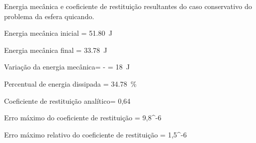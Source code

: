 \begin{table}[h]
\centering
\caption{Energia mecânica e coeficiente de restituição resultantes do caso conservativo do problema da esfera quicando.}
\label{tab:colliding_spheres:dissipative_rotation:energy_and_coefficient_of_restitution}
\begin{parametersdesc}{\textwidth}
	\item{Energia mecânica inicial}{\initial{\mechanicalEnergy} = \SI{51,80}{\joule}}{}
	\item{Energia mecânica final}{\final{\mechanicalEnergy} = \SI{33,78}{\joule}}{}
	\item{Variação da energia mecânica}{\Delta \mechanicalEnergy = \initial{\mechanicalEnergy} - \final{\mechanicalEnergy} = \SI{18}{\joule}}{}
	\item{Percentual de energia dissipada}{\bigslant{\Delta\mechanicalEnergy}{\initial{\mechanicalEnergy}} = \SI{34,78}{\percent}}{}
	\item{Coeficiente de restituição analítico}{\coefficientOfRestitution = 0,64}{}
	\item{Erro máximo do coeficiente de restituição}{\maximumErrorOf{\coefficientOfRestitution} = 9,8^{-6}}{}
	\item{Erro máximo relativo do coeficiente de restituição}{\bigslant{\maximumErrorOf{\coefficientOfRestitution}}{\coefficientOfRestitution} = 1,5^{-6}}{}
\end{parametersdesc}
\sourceMe 
\end{table}

